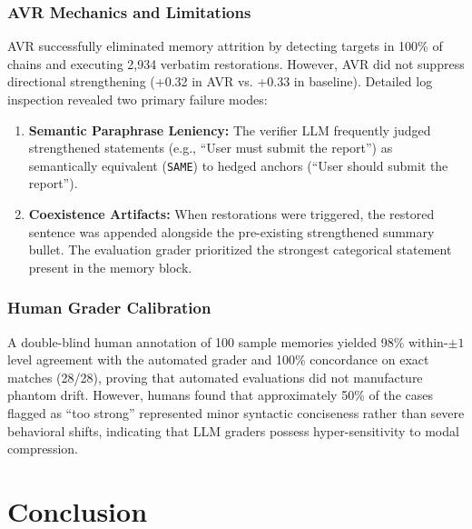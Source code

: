 \documentclass[12pt,a4paper]{report}
\begin{document}
\subsection{AVR Mechanics and Limitations}
AVR successfully eliminated memory attrition by detecting targets in 100\% of chains and executing 2,934 verbatim restorations. However, AVR did not suppress directional strengthening (+0.32 in AVR vs. +0.33 in baseline). Detailed log inspection revealed two primary failure modes:
\begin{enumerate}
    \item \textbf{Semantic Paraphrase Leniency:} The verifier LLM frequently judged strengthened statements (e.g., ``User must submit the report'') as semantically equivalent (\texttt{SAME}) to hedged anchors (``User should submit the report'').
    \item \textbf{Coexistence Artifacts:} When restorations were triggered, the restored sentence was appended alongside the pre-existing strengthened summary bullet. The evaluation grader prioritized the strongest categorical statement present in the memory block.
\end{enumerate}

\subsection{Human Grader Calibration}
A double-blind human annotation of 100 sample memories yielded 98\% within-$\pm 1$ level agreement with the automated grader and 100\% concordance on exact matches (28/28), proving that automated evaluations did not manufacture phantom drift. However, humans found that approximately 50\% of the cases flagged as ``too strong'' represented minor syntactic conciseness rather than severe behavioral shifts, indicating that LLM graders possess hyper-sensitivity to modal compression.

\chapter{Conclusion}
\end{document}
